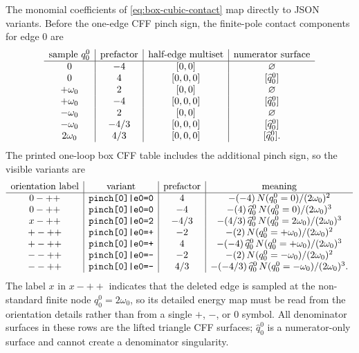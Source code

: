 \documentclass[11pt,a4paper]{report}
\begin{document}
The monomial coefficients of \eqref{eq:box-cubic-contact} map directly to JSON
variants.  Before the one-edge CFF pinch sign, the finite-pole contact
components for edge \(0\) are
\[
\begin{array}{c|c|c|c}
\hbox{sample }q_0^0 & \hbox{prefactor} &
  \hbox{half-edge multiset} & \hbox{numerator surface}\\
\hline
0 & -4 & [0,0] & \varnothing\\
0 & 4 & [0,0,0] & [\widehat q_0^0]\\
+\omega_0 & 2 & [0,0] & \varnothing\\
+\omega_0 & -4 & [0,0,0] & [\widehat q_0^0]\\
-\omega_0 & 2 & [0,0] & \varnothing\\
-\omega_0 & -4/3 & [0,0,0] & [\widehat q_0^0]\\
2\omega_0 & 4/3 & [0,0,0] & [\widehat q_0^0].
\end{array}
\]
The printed one-loop box CFF table includes the additional pinch sign, so the
visible variants are
\[
\begin{array}{c|c|c|c}
\hbox{orientation label} & \hbox{variant} & \hbox{prefactor}
  & \hbox{meaning}\\
\hline
0-++ & \texttt{pinch[0]|e0=0} & 4
  & -(-4)\,N(q_0^0=0)/(2\omega_0)^2\\
0-++ & \texttt{pinch[0]|e0=0} & -4
  & -(4)\,\widehat q_0^0\,N(q_0^0=0)/(2\omega_0)^3\\
x-++ & \texttt{pinch[0]|e0=2} & -4/3
  & -(4/3)\,\widehat q_0^0\,N(q_0^0=2\omega_0)/(2\omega_0)^3\\
+-++ & \texttt{pinch[0]|e0=+} & -2
  & -(2)\,N(q_0^0=+\omega_0)/(2\omega_0)^2\\
+-++ & \texttt{pinch[0]|e0=+} & 4
  & -(-4)\,\widehat q_0^0\,N(q_0^0=+\omega_0)/(2\omega_0)^3\\
--++ & \texttt{pinch[0]|e0=-} & -2
  & -(2)\,N(q_0^0=-\omega_0)/(2\omega_0)^2\\
--++ & \texttt{pinch[0]|e0=-} & 4/3
  & -(-4/3)\,\widehat q_0^0\,N(q_0^0=-\omega_0)/(2\omega_0)^3 .
\end{array}
\]
The label \(x\) in \(x-++\) indicates that the deleted edge is sampled at the
non-standard finite node \(q_0^0=2\omega_0\), so its detailed energy map must be
read from the orientation details rather than from a single \(+\), \(-\), or
\(0\) symbol.  All denominator surfaces in these rows are the lifted triangle
CFF surfaces; \(\widehat q_0^0\) is a numerator-only surface and cannot create
a denominator singularity.
\end{document}
